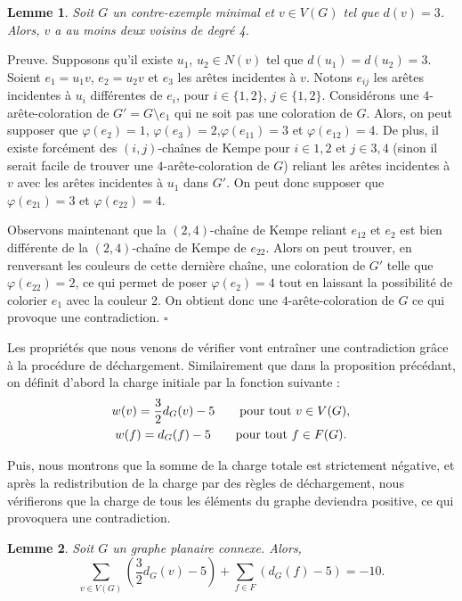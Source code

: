\documentclass[10pt,a4paper]{article}
\newtheorem{lemme}{Lemme}
\newcommand{\ep}{{\hfill $\square$}}
\begin{document}
\begin{lemme}
Soit $G$ un contre-exemple minimal et $v \in V(G)$ tel que $d(v)=3$. Alors, $v$ a au moins deux voisins de degré 4.
\label{le:333}
\end{lemme}

Preuve.
Supposons qu'il existe $u_1$, $u_2 \in N(v)$ tel que $d(u_1) = d(u_2) = 3$. Soient $e_1 = u_1v$, $e_2 = u_2v$ et $e_3$ les arêtes incidentes à $v$. Notons $e_{ij}$ les arêtes incidentes à $u_i$ différentes de $e_i$, pour $i \in \{1,2\}$, $j \in \{1,2\}$. Considérons une $4$-arête-coloration de $G' = G \setminus e_1$ qui ne soit pas une coloration de $G$. Alors, on peut supposer que  $\varphi(e_2)=1$, $\varphi(e_3)=2$,$\varphi(e_{11})=3$ et $\varphi(e_{12})=4$. De plus, il existe forcément des $(i,j)$-chaînes de Kempe pour $i \in {1,2}$ et $j \in {3,4}$ (sinon il serait facile de trouver une $4$-arête-coloration de $G$) reliant les arêtes incidentes à $v$ avec les arêtes incidentes à $u_1$ dans $G'$. On peut donc supposer que $\varphi(e_{21})=3$ et $\varphi(e_{22})=4$.

Observons maintenant que la $(2,4)$-chaîne de Kempe reliant $e_{12}$ et $e_2$ est bien différente de la $(2,4)$-chaîne de Kempe de $e_{22}$. Alors on peut trouver, en renversant les couleurs de cette dernière chaîne, une coloration de $G'$ telle que $\varphi(e_{22}) = 2$, ce qui permet de poser $\varphi(e_2) = 4$ tout en laissant la possibilité de colorier $e_1$ avec la couleur 2. On obtient donc une $4$-arête-coloration de $G$ ce qui provoque une contradiction.
\ep


Les propriétés que nous venons de vérifier vont entraîner une contradiction grâce à la procédure de déchargement. Similairement que dans la proposition précédant, on définit d'abord la charge initiale par la fonction suivante :
$$
\gathered
w(v) = \frac{3}{2} d_G(v) - 5 \qquad \textrm{pour tout $v\in V(G)$,} \\
w(f) = d_G(f) - 5 \qquad \textrm{pour tout $f\in F(G)$.}
\endgathered
$$

Puis, nous montrons que la somme de la charge totale est strictement négative, et après la redistribution de la charge par des règles de déchargement, nous vérifierons que la charge de tous les éléments du graphe deviendra positive, ce qui provoquera une contradiction.


\begin{lemme}
Soit $G$ un graphe planaire connexe. Alors,
$$
\sum_{v \in V(G)} \left(\frac{3}{2} d_G(v) - 5\right) + \sum_{f\in F} \left(d_G(f) -5\right) = -10.
$$
\label{le:cha2}
\end{lemme}
\end{document}
